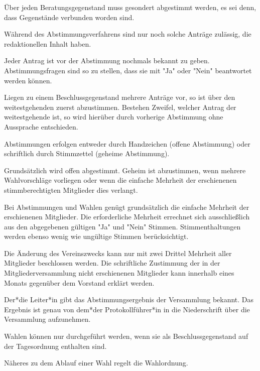 \begin{gfmitglieder}

  Über jeden Beratungsgegenstand muss gesondert abgestimmt werden, es sei denn, dass Gegenstände verbunden worden sind.

  Während des Abstimmungsverfahrens sind nur noch solche Anträge zulässig, die redaktionellen Inhalt haben.

  Jeder Antrag ist vor der Abstimmung nochmals bekannt zu geben. Abstimmungsfragen sind so zu stellen, dass sie mit "Ja" oder "Nein" beantwortet werden können.

  Liegen zu einem Beschlussgegenstand mehrere Anträge vor, so ist über den weitestgehenden zuerst abzustimmen. Bestehen Zweifel, welcher Antrag der weitestgehende ist, so wird hierüber durch vorherige Abstimmung ohne Aussprache entschieden.


  Abstimmungen erfolgen entweder durch Handzeichen (offene Abstimmung) oder schriftlich durch Stimmzettel (geheime Abstimmung).

  Grundsätzlich wird offen abgestimmt. Geheim ist abzustimmen, wenn mehrere Wahlvorschläge vorliegen oder wenn die einfache Mehrheit der erschienenen stimmberechtigten Mitglieder dies verlangt.


  Bei Abstimmungen und Wahlen genügt grundsätzlich die einfache Mehrheit der erschienenen Mitglieder. Die erforderliche Mehrheit errechnet sich ausschließlich aus den abgegebenen gültigen "Ja" und "Nein" Stimmen. Stimmenthaltungen werden ebenso wenig wie ungültige Stimmen berücksichtigt.

  Die Änderung des Vereinszwecks kann nur mit zwei Drittel Mehrheit aller Mitglieder beschlossen werden. Die schriftliche Zustimmung der in der Mitgliederversammlung nicht erschienenen Mitglieder kann innerhalb eines Monats gegenüber dem Vorstand erklärt werden.

  Der*die Leiter*in gibt das Abstimmungsergebnis der Versammlung bekannt. Das Ergebnis ist genau von dem*der Protokollführer*in in die Niederschrift über die Versammlung aufzunehmen.


  Wahlen können nur durchgeführt werden, wenn sie als Beschlussgegenstand auf der Tagesordnung enthalten sind.

  Näheres zu dem Ablauf einer Wahl regelt die Wahlordnung.


\end{gfmitglieder}
